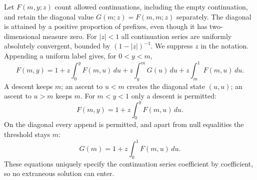 \documentclass[11pt]{article}
\theoremstyle{remark}\newtheorem{remark}[theorem]{Remark}
\begin{document}
Let $F(m,y;z)$ count allowed continuations, including the empty continuation,
and retain the diagonal value
$G(m;z)=F(m,m;z)$ separately. The diagonal is attained by a positive
proportion of prefixes, even though it has two-dimensional measure zero.
For $|z|<1$ all continuation series are uniformly absolutely convergent,
bounded by $(1-|z|)^{-1}$. We suppress $z$ in the notation.
Appending a uniform label gives, for $0<y<m$,
\begin{equation}\label{vav:dg:eq:below}
 F(m,y)=1+z\int_0^yF(m,u)\,du
             +z\int_y^mG(u)\,du+z\int_m^1F(m,u)\,du.
\end{equation}
A descent keeps $m$; an ascent to $u<m$ creates the diagonal state $(u,u)$;
an ascent to $u>m$ keeps $m$. For $m<y<1$ only a descent is permitted:
\begin{equation}\label{vav:dg:eq:above}
 F(m,y)=1+z\int_0^yF(m,u)\,du.
\end{equation}
On the diagonal every append is permitted, and apart from null equalities
the threshold stays $m$:
\begin{equation}\label{vav:dg:eq:diag}
 G(m)=1+z\int_0^1F(m,u)\,du.
\end{equation}
These equations uniquely specify the continuation series coefficient by
coefficient, so no extraneous solution can enter.
\end{document}
